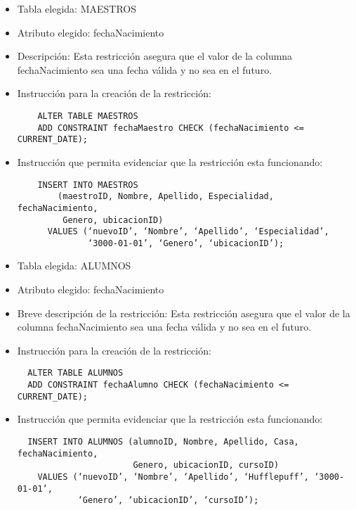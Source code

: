 \begin{itemize} 
  \item Tabla elegida: MAESTROS 
  \item Atributo elegido: fechaNacimiento 
  \item Descripción: Esta restricción asegura que el valor de la columna fechaNacimiento sea una fecha válida y no sea en el futuro. 
  \item Instrucción para la creación de la restricción: 
  \begin{verbatim} 
    ALTER TABLE MAESTROS 
    ADD CONSTRAINT fechaMaestro CHECK (fechaNacimiento <= CURRENT_DATE); 
  \end{verbatim} 
  \item Instrucción que permita evidenciar que la restricción esta funcionando: 
  \begin{verbatim} 
    INSERT INTO MAESTROS 
        (maestroID, Nombre, Apellido, Especialidad, fechaNacimiento, 
         Genero, ubicacionID) 
      VALUES (‘nuevoID’, ‘Nombre’, ‘Apellido’, ‘Especialidad’,
              ‘3000-01-01’, ‘Genero’, ‘ubicacionID’); 
  \end{verbatim}   
\end{itemize}

\begin{itemize} 
  \item Tabla elegida: ALUMNOS 
  \item Atributo elegido: fechaNacimiento 
  \item Breve descripción de la restricción: Esta restricción asegura que el valor de la columna fechaNacimiento sea una fecha válida y no sea en el futuro.
  \item Instrucción para la creación de la restricción: 
  \begin{verbatim} 
  ALTER TABLE ALUMNOS 
  ADD CONSTRAINT fechaAlumno CHECK (fechaNacimiento <= CURRENT_DATE); 
  \end{verbatim} 
  \item Instrucción que permita evidenciar que la restricción esta funcionando: 
  \begin{verbatim} 
  INSERT INTO ALUMNOS (alumnoID, Nombre, Apellido, Casa, fechaNacimiento, 
                       Genero, ubicacionID, cursoID) 
    VALUES (‘nuevoID’, ‘Nombre’, ‘Apellido’, ‘Hufflepuff’, ‘3000-01-01’, 
            ‘Genero’, ‘ubicacionID’, ‘cursoID’); 
  \end{verbatim} 
\end{itemize}


